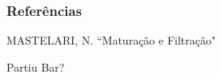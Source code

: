 \documentclass{beamer}
\begin{document}

\begin{frame}
\frametitle{Referências}
\footnotesize{
\begin{thebibliography}{99} %
 MASTELARI, N. ``Maturação e Filtração"
\end{thebibliography}
}
\end{frame}


\begin{frame}
\Huge{\centerline{Partiu Bar?}}
\end{frame}

\end{document}
